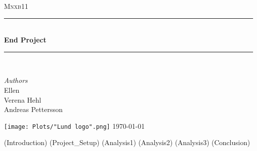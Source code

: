 \documentclass[12pt]{article}
\begin{document}
\makeatletter
\newcommand*{\rom}[1]{\expandafter\@slowromancap\romannumeral #1@}
\makeatother
\begin{titlepage}
	\newcommand{\HRule}{\rule{\linewidth}{0.5mm}}
	\center 	
	\textsc{\LARGE Mnxb11}\\[2cm] 
	\HRule\\[1.0cm]
	{\huge\bfseries End Project }\\[0.4cm] 
	\HRule\\[1.5cm]
	\begin{minipage}[t]{0.5\textwidth}
		\begin{center}
			\large
			\textit{Authors}\\
			Ellen \\
            Verena Hehl\\
            Andreas Pettersson\\
            
            
		\end{center}
	\end{minipage}

	\vfill\vfill\vfill\vfill
   	\texttt{[image: Plots/"Lund logo".png]}
	\vfill\vfill\vfill 
	{\today} 
	\vfill 
\end{titlepage}
\tableofcontents

\thispagestyle{empty} %

\newpage
\sloppy

\setcounter{page}{1} %



(Introduction)
(Project_Setup)
(Analysis1)
(Analysis2)
(Analysis3)
(Conclusion)
\end{document}
